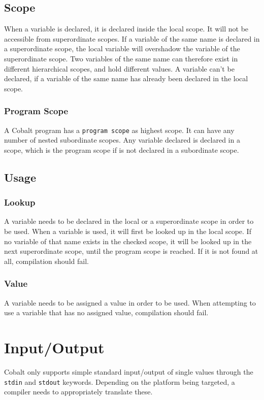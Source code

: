\documentclass[a4paper,appendixprefix]{scrreprt}
\begin{document}
\section{Scope}
When a variable is declared, it is declared inside the local scope. It will not be accessible from superordinate scopes. If a variable of the same name is declared in a superordinate scope, the local variable will overshadow the variable of the superordinate scope. Two variables of the same name can therefore exist in different hierarchical scopes, and hold different values. A variable can't be declared, if a variable of the same name has already been declared in the local scope.

\subsection{Program Scope}
A Cobalt program has a \verb!program scope! as highest scope. It can have any number of nested subordinate scopes. Any variable declared is declared in a scope, which is the program scope if is not declared in a subordinate scope.

\section{Usage}

\subsection{Lookup}
A variable needs to be declared in the local or a superordinate scope in order to be used. When a variable is used, it will first be looked up in the local scope. If no variable of that name exists in the checked scope, it will be looked up in the next superordinate scope, until the program scope is reached. If it is not found at all, compilation should fail.

\subsection{Value}
A variable needs to be assigned a value in order to be used. When attempting to use a variable that has no assigned value, compilation should fail.

\chapter{Input/Output}
Cobalt only supports simple standard input/output of single values through the \verb!stdin! and \verb!stdout! keywords. Depending on the platform being targeted, a compiler needs to appropriately translate these.
\end{document}
